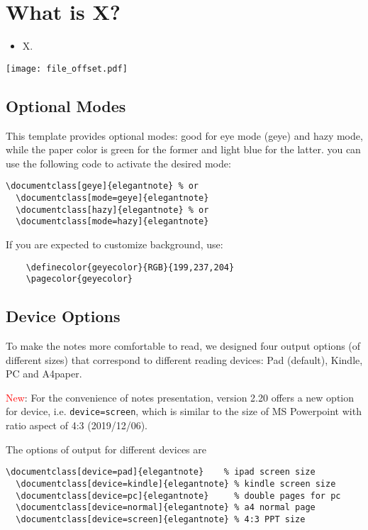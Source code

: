 \documentclass[en,hazy,blue,screen,14pt]{elegantnote}
\begin{document}
\newpage
\section{What is X?}
\begin{itemize}
	\item X.
\end{itemize}
\centerline{\texttt{[image: file\_offset.pdf]}}

\newpage
\subsection{Optional Modes}

This template provides optional modes: good for eye mode (geye) and hazy mode, while the paper color is green for the former and light blue for the latter. you can use the following code to activate the desired mode:
\begin{lstlisting}[frame=none]  
  \documentclass[geye]{elegantnote} % or
  \documentclass[mode=geye]{elegantnote}
  \documentclass[hazy]{elegantnote} % or
  \documentclass[mode=hazy]{elegantnote}
\end{lstlisting}

\begin{remark}
  If you are expected to customize background, use:
  \begin{lstlisting}
    \definecolor{geyecolor}{RGB}{199,237,204}
    \pagecolor{geyecolor}
  \end{lstlisting}
\end{remark}

\newpage
\subsection{Device Options}

To make the notes more comfortable to read, we designed four output options (of different sizes) that correspond to different reading devices: Pad (default), Kindle, PC and A4paper. 

\textcolor{red}{New}: For the convenience of notes presentation, version 2.20 offers a new option for device, i.e. \lstinline{device=screen}, which is similar to the size of MS Powerpoint with ratio aspect of 4:3 (2019/12/06).

The options of output for different devices are
\begin{lstlisting}[frame=none]  
  \documentclass[device=pad]{elegantnote}    % ipad screen size
  \documentclass[device=kindle]{elegantnote} % kindle screen size
  \documentclass[device=pc]{elegantnote}     % double pages for pc 
  \documentclass[device=normal]{elegantnote} % a4 normal page
  \documentclass[device=screen]{elegantnote} % 4:3 PPT size
\end{lstlisting}
\end{document}
